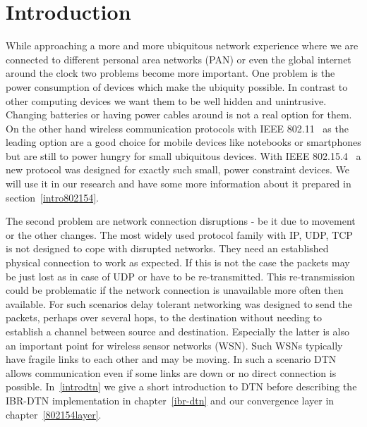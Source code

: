 \chapter{Introduction}
While approaching a more and more ubiquitous network experience where we are
connected to different personal area networks (PAN) or even the global internet
around the clock two problems become more important. One problem is the power
consumption of devices which make the ubiquity possible. In contrast to other
computing devices we want them to be well hidden and unintrusive. Changing
batteries or having power cables around is not a real option for them. On the
other hand wireless communication protocols with IEEE 802.11~\cite{ieee80211} as the
leading option are a good choice for mobile devices like notebooks or
smartphones but are still to power hungry for small ubiquitous devices.
With IEEE 802.15.4~\cite{ieee802154} a new protocol was designed for exactly such
small, power constraint devices. We will use it in our research and have some
more information about it prepared in section~\ref{intro802154}.

The second problem are network connection disruptions - be it due to movement or
the other changes. The most widely used protocol family with IP, UDP, TCP is not
designed to cope with disrupted networks. They need an established physical connection
to work as expected. If this is not the case the packets may be just lost
as in case of UDP or have to be re-transmitted. This re-transmission could be
problematic if the network connection is unavailable more often then available.
For such scenarios delay tolerant networking was designed to send the
packets, perhaps over several hops, to the destination without needing to
establish a channel between source and destination. Especially the latter is
also an important point for wireless sensor networks (WSN). Such WSNs typically
have fragile links to each other and may be moving. In such a scenario DTN
allows communication even if some links are down or no direct connection is
possible. In~\ref{introdtn} we give a short introduction to DTN before describing
the IBR-DTN implementation in chapter~\ref{ibr-dtn} and our convergence layer in
chapter~\ref{802154layer}.

